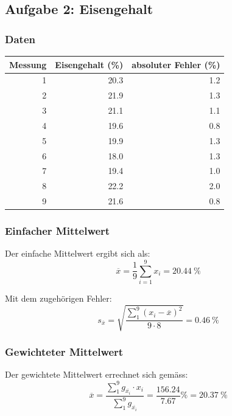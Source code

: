 \clearpage
\subsection{Aufgabe 2: Eisengehalt}

\subsubsection{Daten}
\begin{center}
\begin{tabular}{rrr}
    \toprule
    Messung & Eisengehalt (\%) & absoluter Fehler (\%) \\
    \midrule
    1 & 20.3 & 1.2 \\
    2 & 21.9 & 1.3 \\
    3 & 21.1 & 1.1 \\
    4 & 19.6 & 0.8 \\
    5 & 19.9 & 1.3 \\
    6 & 18.0 & 1.3 \\
    7 & 19.4 & 1.0 \\
    8 & 22.2 & 2.0 \\
    9 & 21.6 & 0.8 \\
    \bottomrule
\end{tabular}
\end{center}

\subsubsection{Einfacher Mittelwert}

Der einfache Mittelwert ergibt sich als:
\begin{equation}
    \overline{x} = \frac{1}{9}\sum_{i=1}^9 x_i = \SI{20.44}{\percent}
\end{equation}

Mit dem zugeh\"origen Fehler:
\begin{equation}
    s_{\overline{x}} = \sqrt{\frac{\sum_1^9(x_i-\overline{x})^2}{9 \cdot 8}} = \SI{0.46}{\percent}
\end{equation}


\subsubsection{Gewichteter Mittelwert}

Der gewichtete Mittelwert errechnet sich gem\"ass:
\begin{equation}
    \overline{x} = \frac{\sum_1^9 g_{\overline{x_i}} \cdot x_i}{\sum_1^9 g_{\overline{x_i}}} = \frac{156.24}{7.67} \si{\percent} = \SI{20.37}{\percent}
\end{equation}

